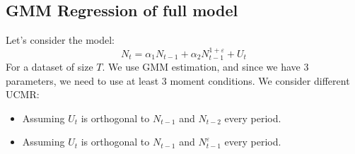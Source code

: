  \subsection{GMM Regression of full model}
    Let's consider the model:
    \begin{equation}
        N_{t} = \alpha_1 N_{t-1} + \alpha_2 N_{t-1}^{1 + \varepsilon} + U_t\label{eq:equation1}
    \end{equation}
    For a dataset of size $T$. We use GMM estimation, and since we have $3$ parameters, we need to use at least 3 moment conditions.
    We consider different UCMR:
    \begin{itemize}
        \item Assuming $U_t$ is orthogonal to $N_{t-1}$ and $N_{t-2}$ every period.
        \item Assuming $U_t$ is orthogonal to $N_{t-1}$ and $N^{\varepsilon}_{t-1}$ every period.
    \end{itemize}

